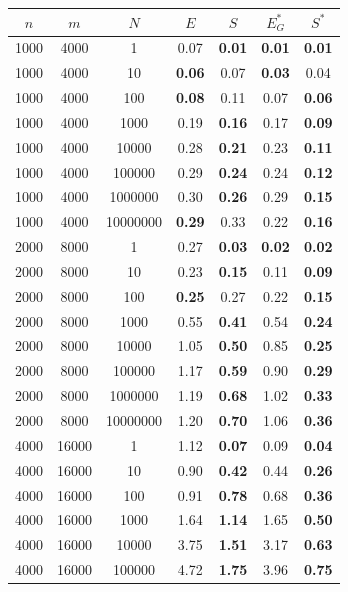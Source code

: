 \begin{table}
\centering
\begin{tabular}{
ccc|cc|cc}
$n$ & $m$ & $N$ & $E$ & $S$ & $E^*_G$ & $S^*$ \\
\hline
1000 & 4000 & 1 & 0.07 & \textbf{0.01} & \textbf{0.01} & \textbf{0.01} \\
1000 & 4000 & 10 & \textbf{0.06} & 0.07 & \textbf{0.03} & 0.04 \\
1000 & 4000 & 100 & \textbf{0.08} & 0.11 & 0.07 & \textbf{0.06} \\
1000 & 4000 & 1000 & 0.19 & \textbf{0.16} & 0.17 & \textbf{0.09} \\
1000 & 4000 & 10000 & 0.28 & \textbf{0.21} & 0.23 & \textbf{0.11} \\
1000 & 4000 & 100000 & 0.29 & \textbf{0.24} & 0.24 & \textbf{0.12} \\
1000 & 4000 & 1000000 & 0.30 & \textbf{0.26} & 0.29 & \textbf{0.15} \\
1000 & 4000 & 10000000 & \textbf{0.29} & 0.33 & 0.22 & \textbf{0.16} \\
\hline
2000 & 8000 & 1 & 0.27 & \textbf{0.03} & \textbf{0.02} & \textbf{0.02} \\
2000 & 8000 & 10 & 0.23 & \textbf{0.15} & 0.11 & \textbf{0.09} \\
2000 & 8000 & 100 & \textbf{0.25} & 0.27 & 0.22 & \textbf{0.15} \\
2000 & 8000 & 1000 & 0.55 & \textbf{0.41} & 0.54 & \textbf{0.24} \\
2000 & 8000 & 10000 & 1.05 & \textbf{0.50} & 0.85 & \textbf{0.25} \\
2000 & 8000 & 100000 & 1.17 & \textbf{0.59} & 0.90 & \textbf{0.29} \\
2000 & 8000 & 1000000 & 1.19 & \textbf{0.68} & 1.02 & \textbf{0.33} \\
2000 & 8000 & 10000000 & 1.20 & \textbf{0.70} & 1.06 & \textbf{0.36} \\
\hline
4000 & 16000 & 1 & 1.12 & \textbf{0.07} & 0.09 & \textbf{0.04} \\
4000 & 16000 & 10 & 0.90 & \textbf{0.42} & 0.44 & \textbf{0.26} \\
4000 & 16000 & 100 & 0.91 & \textbf{0.78} & 0.68 & \textbf{0.36} \\
4000 & 16000 & 1000 & 1.64 & \textbf{1.14} & 1.65 & \textbf{0.50} \\
4000 & 16000 & 10000 & 3.75 & \textbf{1.51} & 3.17 & \textbf{0.63} \\
4000 & 16000 & 100000 & 4.72 & \textbf{1.75} & 3.96 & \textbf{0.75} \\

\end{tabular}
\end{table}
